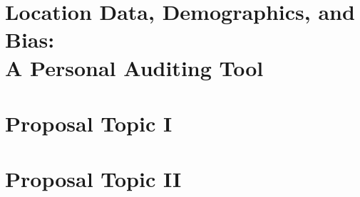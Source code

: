 \documentclass[12pt]{article}
\begin{document}
\section{Location Data, Demographics, and Bias:\\A Personal Auditing Tool}
\label{sec:findyou}



\section{Proposal Topic I}
\label{sec:proposal-i}



\section{Proposal Topic II}
\label{sec:proposal-ii}



% 


\pagebreak

\begin{footnotesize}

% 

\end{footnotesize}
\end{document}
